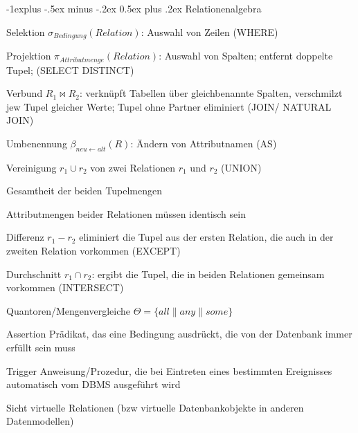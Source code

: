 \documentclass[a4paper]{article}
\makeatletter
\renewcommand{\subsection}{\@startsection{subsection}{2}{0mm}%
                                {-1explus -.5ex minus -.2ex}%
                                {0.5ex plus .2ex}%
                                {\normalfont\normalsize\bfseries}}
\makeatother
\begin{document}
\begin{multicols}{3}
    \subsection{Relationenalgebra}
    \begin{description*}
        \item[Selektion] $\sigma_{Bedingung} (Relation)$: Auswahl von Zeilen (WHERE)
        \item[Projektion] $\pi_{Attributmenge}(Relation)$: Auswahl von Spalten; entfernt doppelte Tupel; (SELECT DISTINCT)
        \item[Verbund] $R_1 \bowtie R_2$: verknüpft Tabellen über gleichbenannte Spalten, verschmilzt jew Tupel gleicher Werte; Tupel ohne Partner eliminiert (JOIN/ NATURAL JOIN)
        \item[Umbenennung] $\beta_{neu\leftarrow alt} (R)$: Ändern von Attributnamen (AS)
        \item[Vereinigung] $r_1 \cup r_2$ von zwei Relationen $r_1$ und $r_2$ (UNION)
        \begin{itemize*}
            \item Gesamtheit der beiden Tupelmengen
            \item Attributmengen beider Relationen müssen identisch sein
        \end{itemize*}
        \item[Differenz] $r_1 - r_2$ eliminiert die Tupel aus der ersten Relation, die auch in der zweiten Relation vorkommen (EXCEPT)
        \item[Durchschnitt] $r_1 \cap r_2$: ergibt die Tupel, die in beiden Relationen gemeinsam vorkommen (INTERSECT)
        \item[Quantoren/Mengenvergleiche] $\Theta =\{ all \| any \| some \}$
        \item[Assertion] Prädikat, das eine Bedingung ausdrückt, die von der Datenbank immer erfüllt sein muss
        \item[Trigger] Anweisung/Prozedur, die bei Eintreten eines bestimmten Ereignisses automatisch vom DBMS ausgeführt wird
        \item[Sicht] virtuelle Relationen (bzw virtuelle Datenbankobjekte in anderen Datenmodellen)
    \end{description*}


\end{multicols}
\end{document}
